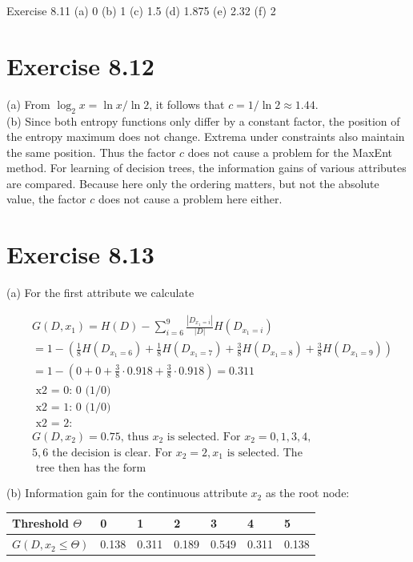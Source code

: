 \documentclass[10pt]{article}
\begin{document}
Exercise 8.11 (a) 0 (b) 1 (c) 1.5 (d) 1.875 (e) 2.32 (f) 2

\section*{Exercise 8.12}
(a) From $\log _{2} x=\ln x / \ln 2$, it follows that $c=1 / \ln 2 \approx 1.44$.\\
(b) Since both entropy functions only differ by a constant factor, the position of the entropy maximum does not change. Extrema under constraints also maintain the same position. Thus the factor $c$ does not cause a problem for the MaxEnt method. For learning of decision trees, the information gains of various attributes are compared. Because here only the ordering matters, but not the absolute value, the factor $c$ does not cause a problem here either.

\section*{Exercise 8.13}
(a) For the first attribute we calculate

$$
\begin{aligned}
& G\left(D, x_{1}\right)=H(D)-\sum_{i=6}^{9} \frac{\left|D_{x_{1}=i}\right|}{|D|} H\left(D_{x_{1}=i}\right) \\
& =1-\left(\frac{1}{8} H\left(D_{x_{1}=6}\right)+\frac{1}{8} H\left(D_{x_{1}=7}\right)+\frac{3}{8} H\left(D_{x_{1}=8}\right)+\frac{3}{8} H\left(D_{x_{1}=9}\right)\right) \\
& =1-\left(0+0+\frac{3}{8} \cdot 0.918+\frac{3}{8} \cdot 0.918\right)=0.311 \\
& \text { x2 = 0: 0 (1/0) } \\
& \text { x2 = 1: } 0 \text { (1/0) } \\
& \text { x2 = 2: } \\
& G\left(D, x_{2}\right)=0.75 \text {, thus } x_{2} \text { is selected. For } x_{2}=0,1,3,4, \\
& 5,6 \text { the decision is clear. For } x_{2}=2, x_{1} \text { is selected. The } \\
& \text { tree then has the form }
\end{aligned}
$$

(b) Information gain for the continuous attribute $x_{2}$ as the root node:

\begin{center}
\begin{tabular}{lllllll}
Threshold $\Theta$ & 0 & 1 & 2 & 3 & 4 & 5 \\
\hline
$G\left(D, x_{2} \leq \Theta\right)$ & 0.138 & 0.311 & 0.189 & 0.549 & 0.311 & 0.138 \\
\hline
\end{tabular}
\end{center}
\end{document}
